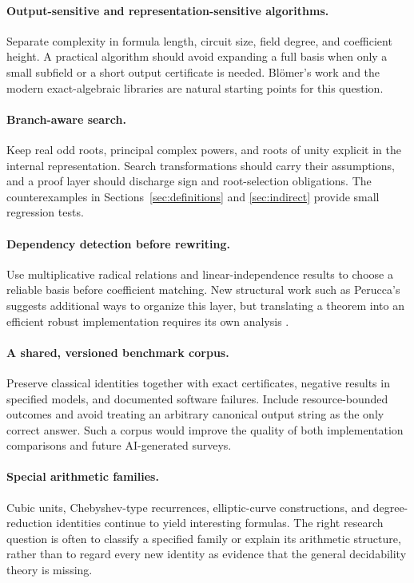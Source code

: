 \documentclass[11pt,letterpaper]{article}
\numberwithin{equation}{section}
\theoremstyle{definition}
\theoremstyle{remark}
\begin{document}
\paragraph{Output-sensitive and representation-sensitive algorithms.} Separate complexity in formula length, circuit size, field degree, and coefficient height. A practical algorithm should avoid expanding a full basis when only a small subfield or a short output certificate is needed. Bl\"omer's work and the modern exact-algebraic libraries are natural starting points for this question.

\paragraph{Branch-aware search.} Keep real odd roots, principal complex powers, and roots of unity explicit in the internal representation. Search transformations should carry their assumptions, and a proof layer should discharge sign and root-selection obligations. The counterexamples in Sections~\ref{sec:definitions} and \ref{sec:indirect} provide small regression tests.

\paragraph{Dependency detection before rewriting.} Use multiplicative radical relations and linear-independence results to choose a reliable basis before coefficient matching. New structural work such as Perucca's suggests additional ways to organize this layer, but translating a theorem into an efficient robust implementation requires its own analysis \cite{perucca}.

\paragraph{A shared, versioned benchmark corpus.} Preserve classical identities together with exact certificates, negative results in specified models, and documented software failures. Include resource-bounded outcomes and avoid treating an arbitrary canonical output string as the only correct answer. Such a corpus would improve the quality of both implementation comparisons and future AI-generated surveys.

\paragraph{Special arithmetic families.} Cubic units, Chebyshev-type recurrences, elliptic-curve constructions, and degree-reduction identities continue to yield interesting formulas. The right research question is often to classify a specified family or explain its arithmetic structure, rather than to regard every new identity as evidence that the general decidability theory is missing.
\end{document}
